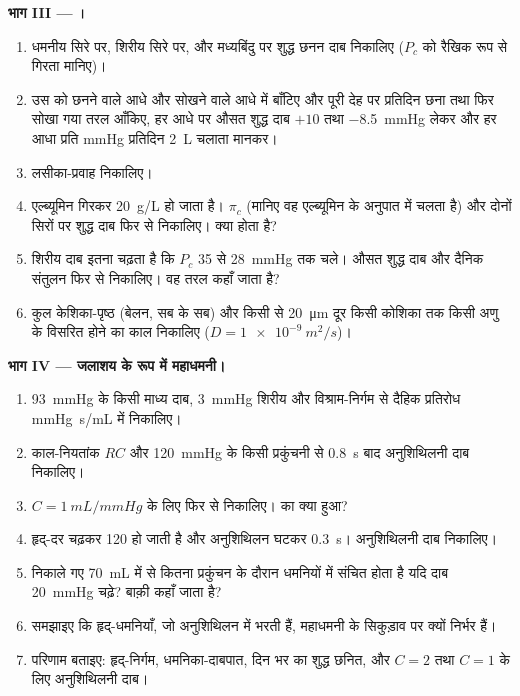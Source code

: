 \begin{problem}
\medskip
\noindent\textbf{भाग III --- ।}
\begin{enumerate}[resume]
  \item धमनीय सिरे पर, शिरीय सिरे पर, और मध्यबिंदु पर शुद्ध छनन
        दाब निकालिए ($P_c$ को रैखिक रूप से गिरता
        मानिए)।
  \item उस  को छनने वाले आधे और
        सोखने वाले आधे में बाँटिए और पूरी देह पर प्रतिदिन छना तथा
        फिर सोखा गया तरल आँकिए, हर आधे पर औसत शुद्ध
        दाब $+10$ तथा
        \qty{-8.5}{mmHg} लेकर और हर आधा प्रति mmHg प्रतिदिन \qty{2}{L}
        चलाता मानकर।
  \item लसीका-प्रवाह निकालिए।
  \item {} एल्ब्यूमिन गिरकर \qty{20}{g/L} हो जाता है। $\pi_c$
        (मानिए वह एल्ब्यूमिन के अनुपात में चलता है) और दोनों सिरों पर
        शुद्ध दाब फिर से निकालिए। क्या होता है?
  \item शिरीय दाब इतना चढ़ता है कि $P_c$ 35 से
        \qty{28}{mmHg} तक चले। औसत शुद्ध दाब और
        दैनिक संतुलन फिर से निकालिए। वह तरल कहाँ जाता है?
  \item कुल केशिका-पृष्ठ (बेलन, सब के सब) और किसी
         से \qty{20}{\micro m} दूर किसी कोशिका तक किसी अणु के
        विसरित होने का काल निकालिए ($D = \qty{1e-9}{m^2/s}$)।
\end{enumerate}

\medskip
\noindent\textbf{भाग IV --- जलाशय के रूप में महाधमनी।}
\begin{enumerate}[resume]
  \item \qty{93}{mmHg} के किसी माध्य दाब, \qty{3}{mmHg} शिरीय
        और विश्राम-निर्गम से दैहिक प्रतिरोध
        \unit{mmHg.s/mL} में निकालिए।
  \item काल-नियतांक $RC$ और \qty{120}{mmHg} के किसी प्रकुंचनी से
        \qty{0.8}{s} बाद अनुशिथिलनी दाब निकालिए।
  \item $C = \qty{1}{mL/mmHg}$ के लिए फिर से निकालिए।
         का क्या हुआ?
  \item हृद्-दर चढ़कर \num{120} हो जाती है और अनुशिथिलन घटकर
        \qty{0.3}{s}। अनुशिथिलनी दाब निकालिए।
  \item निकाले गए \qty{70}{mL} में से कितना प्रकुंचन के दौरान
        धमनियों में संचित होता है यदि दाब
        \qty{20}{mmHg} चढ़े? बाक़ी कहाँ जाता है?
  \item समझाइए कि हृद्-धमनियाँ, जो अनुशिथिलन में भरती हैं,
        महाधमनी के सिकुड़ाव पर क्यों निर्भर हैं।
  \item परिणाम बताइए: हृद्-निर्गम,
        धमनिका-दाबपात, दिन भर का शुद्ध छनित, और $C = 2$ तथा $C = 1$ के लिए
        अनुशिथिलनी दाब।
\end{enumerate}
\end{problem}

